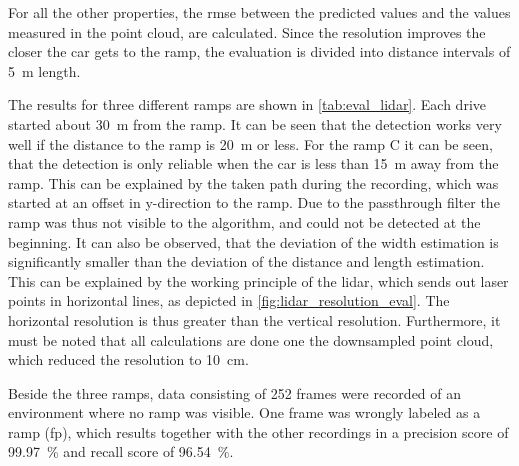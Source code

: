 For all the other properties, the \gls{rmse} between the predicted values and the values measured in the point cloud, are calculated.
Since the resolution improves the closer the car gets to the ramp, the evaluation is divided into distance intervals of \SI{5}{\metre} length.\par
The results for three different ramps are shown in \cref{tab:eval_lidar}.
Each drive started about \SI{30}{\metre} from the ramp.
It can be seen that the detection works very well if the distance to the ramp is \SI{20}{\metre} or less.
For the ramp C it can be seen, that the detection is only reliable when the car is less than \SI{15}{\metre} away from the ramp.
This can be explained by the taken path during the recording, which was started at an offset in y-direction to the ramp.
Due to the passthrough filter the ramp was thus not visible to the algorithm, and could not be detected at the beginning.
It can also be observed, that the deviation of the width estimation is significantly smaller than the deviation of the distance and length estimation.
This can be explained by the working principle of the \gls{lidar}, which sends out laser points in horizontal lines, as depicted in \cref{fig:lidar_resolution_eval}.
The horizontal resolution is thus greater than the vertical resolution.
Furthermore, it must be noted that all calculations are done one the downsampled point cloud, which reduced the resolution to \SI{10}{\cm}.\par
Beside the three ramps, data consisting of 252 frames were recorded of an environment where no ramp was visible.
One frame was wrongly labeled as a ramp (\gls{fp}), which results together with the other recordings in a precision score of \SI{99.97}{\percent} and recall score of \SI{96.54}{\percent}.\par
\renewcommand{\arraystretch}{1}
